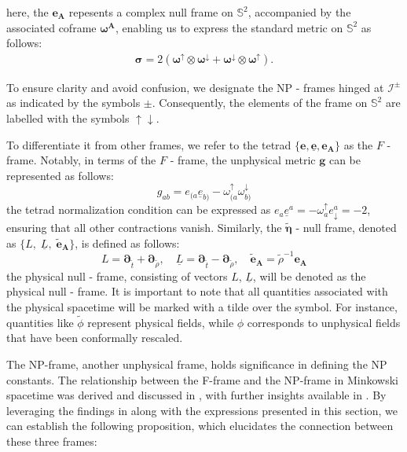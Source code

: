 here, the $\boldsymbol{e}_{\boldsymbol{A}}$ repesents a complex null frame on $\mathbb{S}^2$, accompanied by the associated coframe $\boldsymbol{\omega}^{\boldsymbol{A}}$, enabling us to express the standard metric on $\mathbb{S}^2$ as follows:
\begin{align}
\bm\sigma=2(\bm\omega^{\uparrow}\otimes \bm\omega^{\downarrow}+\bm\omega^{\downarrow}\otimes \bm\omega^{\uparrow}).
\end{align}
\begin{remark}
  To ensure clarity and avoid confusion, we designate the NP - frames hinged at $\mathscr{I}^{\pm}$ as indicated by the symbols $\pm$. Consequently, the elements of the frame on $\mathbb{S}^2$ are labelled with the symbols $\uparrow \downarrow$.
\end{remark}

To differentiate it from other frames, we refer to the tetrad $\{\boldsymbol{e}, \underline{\boldsymbol{e}}, \boldsymbol{e}_{\boldsymbol{A}}\}$ as the $F$ - frame. Notably, in terms of the $F$ - frame, the unphysical metric $\boldsymbol{g}$ can be represented as follows:
\begin{equation}\label{eq:UnphysicalMetricNullTetrad}
  g_{a b}=e_{(a} \underline{e}_{b)}-\omega_{(a}^{\uparrow} \omega_{b)}^{\downarrow}
\end{equation}
the tetrad normalization condition can be expressed as $e_a \underline{e}^a=-\omega^{\uparrow}_ae_{\downarrow}^a=-2$, ensuring that all other contractions vanish. Similarly, the $\tilde{\boldsymbol{\eta}}$ - null frame, denoted as $\{L, \; \underline{L},\; \tilde{\boldsymbol{e}}_{\boldsymbol{A}}\}$, is defined as follows:
\begin{equation}
  L=\boldsymbol{\partial}_{\tilde{t}}+\boldsymbol{\partial}_{\tilde{\rho}}, \quad \underline{L}=\boldsymbol{\partial}_{\tilde{t}}-\boldsymbol{\partial}_{\tilde{\rho}}, \quad \tilde{\boldsymbol{e}}_{\boldsymbol{A}}=\tilde{\rho}^{-1} \boldsymbol{e}_{\boldsymbol{A}}
\end{equation}
the physical null - frame, consisting of vectors $L$, $\underline{L}$, will be denoted as the physical null - frame. It is important to note that all quantities associated with the physical spacetime will be marked with a tilde over the symbol. For instance, quantities like $\tilde{\phi}$ represent physical fields, while $\phi$ corresponds to unphysical fields that have been conformally rescaled.

The NP-frame, another unphysical frame, holds significance in defining the NP constants. The relationship between the F-frame and the NP-frame in Minkowski spacetime was derived and discussed in \cite{GasKro16d}, with further insights available in \cite{ValAli22}. By leveraging the findings in \cite{GasKro16d} along with the expressions presented in this section, we can establish the following proposition, which elucidates the connection between these three frames:
 
